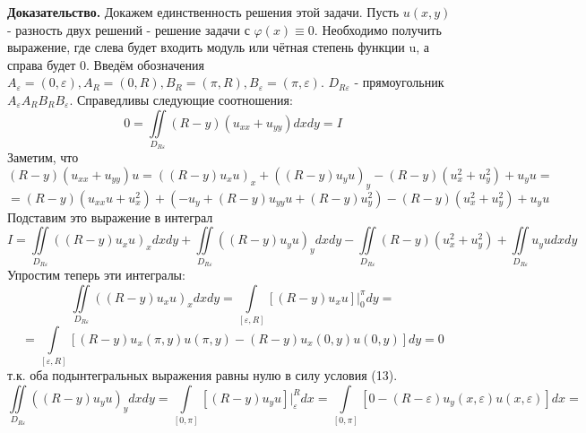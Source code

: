 \documentclass[12pt, a4paper]{article}
\begin{document}
\textbf{Доказательство.} 
	Докажем единственность решения этой задачи. Пусть $u(x,y)$ - разность двух решений - решение задачи с $\varphi(x) \equiv 0$. Необходимо получить выражение, где слева будет входить модуль или чётная степень функции u, а справа будет 0.\newline
	Введём обозначения $A_\varepsilon = (0, \varepsilon), A_R = (0, R), B_R = (\pi, R), B_\varepsilon = (\pi, \varepsilon)$. $D_{R\varepsilon}$ - прямоугольник $A_\varepsilon A_R B_R B_\varepsilon$. Справедливы следующие соотношения:
	\begin{equation*}
		0 = \iint\limits_{D_{R\varepsilon}} (R-y) (u_{xx} + u_{yy}) dx dy = I
	\end{equation*}
	Заметим, что 
	\begin{equation*}
		(R - y) (u_{xx} + u_{yy}) u = \left( \left(R - y\right) u_x u\right)_x  + \left( \left(R - y\right) u_y u\right)_y - \left(R- y\right) \left(u_x^2 + u_y^2\right) +  u_y u = 
	\end{equation*}
	\begin{equation*}
		= \left(R-y\right) \left(u_{xx} u + u_x^2\right) + \left(-u_y + \left(R-y\right) u_{yy} u + \left(R-y\right)u_y^2\right) - \left(R- y\right) \left(u_x^2 + u_y^2\right)+  u_y u
	\end{equation*}
	\newline Подставим это выражение в интеграл
	\begin{equation*}
		I	=	\iint\limits_{D_{R\varepsilon}} \left( \left(R - y\right) u_x u\right)_x dx dy  + \iint\limits_{D_{R\varepsilon}} \left( \left(R - y\right) u_y u\right)_y dx dy   
		- \iint\limits_{D_{R\varepsilon}} \left(R- y\right) \left(u_x^2 + u_y^2\right) + \iint\limits_{D_{R\varepsilon}} u_y u dx dy
	\end{equation*}
	Упростим теперь эти интегралы:\newline
	\begin{equation*}
		\iint\limits_{D_{R\varepsilon}} \left( \left(R - y\right) u_x u\right)_x dx dy = \int\limits_{[\varepsilon, R]} \left[(R-y)u_xu\right] \vert_0^\pi dy =  
	\end{equation*}
	\begin{equation*}
	 = \int\limits_{[\varepsilon, R]} \left[(R-y) u_x(\pi, y)u(\pi,y) - (R-y) u_x(0, y)u(0,y)\right]dy = 0
	\end{equation*}
	т.к. оба подынтегральных выражения равны нулю в силу условия (13).  \newline
	\begin{equation*}
		\iint\limits_{D_{R\varepsilon}} \left( \left(R - y\right) u_y u\right)_y dx dy = \int\limits_{[0,\pi]} \left[\left(R - y\right) u_y u\right] \vert_\varepsilon^R dx =
		\int\limits_{[0,\pi]} \left[0 - \left(R - \varepsilon \right) u_y(x, \varepsilon) u(x, \varepsilon) \right] dx = 
	\end{equation*} 
\end{document}
